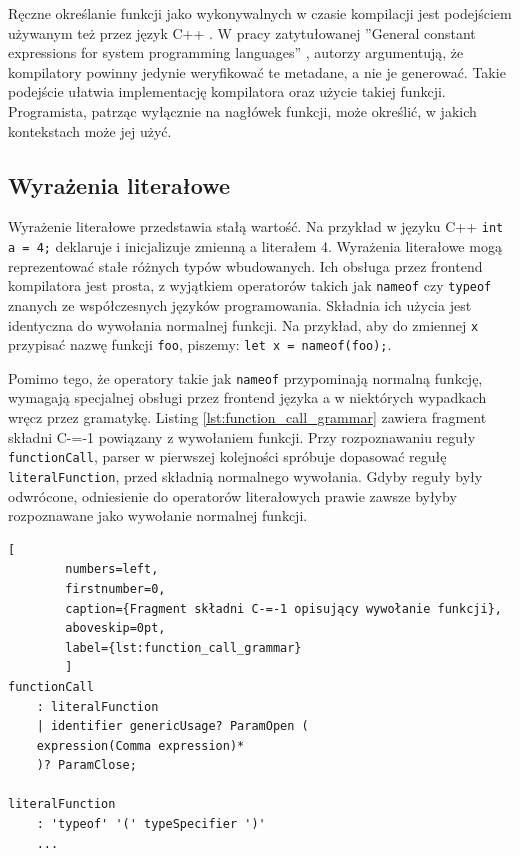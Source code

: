 Ręczne określanie funkcji jako wykonywalnych w czasie kompilacji jest podejściem używanym też przez język C++ \cite{ISO:2012:III}.
W pracy zatytułowanej ''General constant expressions for system programming languages'' \cite{dos2010general_constant_expressions}, autorzy argumentują, że kompilatory powinny jedynie weryfikować te metadane, a nie je generować.
Takie podejście ułatwia implementację kompilatora oraz użycie takiej funkcji.
Programista, patrząc wyłącznie na nagłówek funkcji, może określić, w jakich kontekstach może jej użyć.

\begin{minipage}{\textwidth}
	
	
		
\end{minipage}
\subsection{Wyrażenia literałowe}

Wyrażenie literałowe przedstawia stałą wartość.
Na przykład w języku C++ \lstinline{int a = 4;} deklaruje i inicjalizuje zmienną a literałem 4.
Wyrażenia literałowe mogą reprezentować stałe różnych typów wbudowanych.
Ich obsługa przez frontend kompilatora jest prosta, z wyjątkiem operatorów takich jak \lstinline{nameof} czy \lstinline{typeof} znanych ze współczesnych języków programowania.
Składnia ich użycia jest identyczna do wywołania normalnej funkcji.
Na przykład, aby do zmiennej \lstinline{x} przypisać nazwę funkcji \lstinline{foo}, piszemy: \lstinline{let x = nameof(foo);}.


Pomimo tego, że operatory takie jak \lstinline{nameof} przypominają normalną funkcję, wymagają specjalnej obsługi przez frontend języka a w niektórych wypadkach wręcz przez gramatykę.
Listing \ref{lst:function_call_grammar} zawiera fragment składni C-=-1 powiązany z wywołaniem funkcji.
Przy rozpoznawaniu reguły \lstinline{functionCall}, parser w pierwszej kolejności spróbuje dopasować regułę \lstinline{literalFunction}, przed składnią normalnego wywołania.
Gdyby reguły były odwrócone, odniesienie do operatorów literałowych prawie zawsze byłyby rozpoznawane jako wywołanie normalnej funkcji.

\begin{minipage}{\linewidth}
	\begin{lstlisting}[
		numbers=left,
		firstnumber=0,
		caption={Fragment składni C-=-1 opisujący wywołanie funkcji},
		aboveskip=0pt,
		label={lst:function_call_grammar}
		]
functionCall
	: literalFunction
	| identifier genericUsage? ParamOpen (
	expression(Comma expression)*
	)? ParamClose;

literalFunction
	: 'typeof' '(' typeSpecifier ')'
	...
	\end{lstlisting}
\end{minipage}


